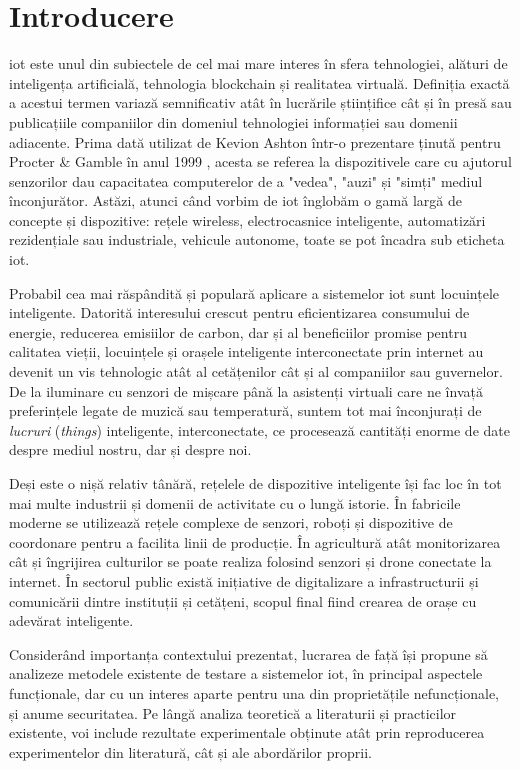 \chapter{Introducere}

\acrlong{iot} este unul din subiectele de cel mai mare interes în sfera tehnologiei,
alături de inteligența artificială, tehnologia blockchain și realitatea virtuală. 
Definiția exactă a acestui termen variază semnificativ atât în lucrările
științifice cât și în presă sau publicațiile companiilor din domeniul tehnologiei informației sau domenii adiacente. Prima dată utilizat de Kevion Ashton într-o prezentare ținută pentru Procter \& Gamble în anul 1999 \cite{ashton_2009}, acesta se referea la dispozitivele care cu ajutorul senzorilor dau capacitatea computerelor de a "vedea", "auzi" și "simți" mediul înconjurător. Astăzi, atunci când vorbim de \acrshort{iot} înglobăm o gamă largă de concepte și dispozitive: rețele wireless, electrocasnice inteligente, automatizări rezidențiale sau industriale, vehicule autonome, toate se pot încadra sub eticheta \acrshort{iot}.

Probabil cea mai răspândită și populară aplicare a sistemelor \acrshort{iot} sunt locuințele inteligente. Datorită interesului crescut pentru eficientizarea consumului de energie, reducerea emisiilor de carbon, dar și al beneficiilor promise pentru calitatea vieții, locuințele și orașele inteligente interconectate prin internet au devenit un vis tehnologic atât al cetățenilor cât și al companiilor sau guvernelor. De la iluminare cu senzori de mișcare până la asistenți virtuali care ne învață preferințele legate de muzică sau temperatură, suntem tot mai înconjurați de \textit{lucruri} (\textit{things}) inteligente, interconectate, ce procesează cantități enorme de date despre mediul nostru, dar și despre noi. 

Deși este o nișă relativ tânără, rețelele de dispozitive inteligente își fac loc în tot mai multe industrii și domenii de activitate cu o lungă istorie. În fabricile moderne se utilizează rețele complexe de senzori, roboți și dispozitive de coordonare pentru a facilita linii de producție. În agricultură atât monitorizarea cât și îngrijirea culturilor se poate realiza folosind senzori și drone conectate la internet. În sectorul public există inițiative de digitalizare a infrastructurii și comunicării dintre instituții și cetățeni, scopul final fiind crearea de orașe cu adevărat inteligente. 

Considerând importanța contextului prezentat, lucrarea de față își propune să analizeze metodele existente de testare a sistemelor \acrshort{iot}, în principal aspectele funcționale, dar cu un interes aparte pentru una din proprietățile nefuncționale, și anume securitatea. Pe lângă analiza teoretică a literaturii și practicilor existente, voi include rezultate experimentale obținute atât prin reproducerea experimentelor din literatură, cât și ale abordărilor proprii.

